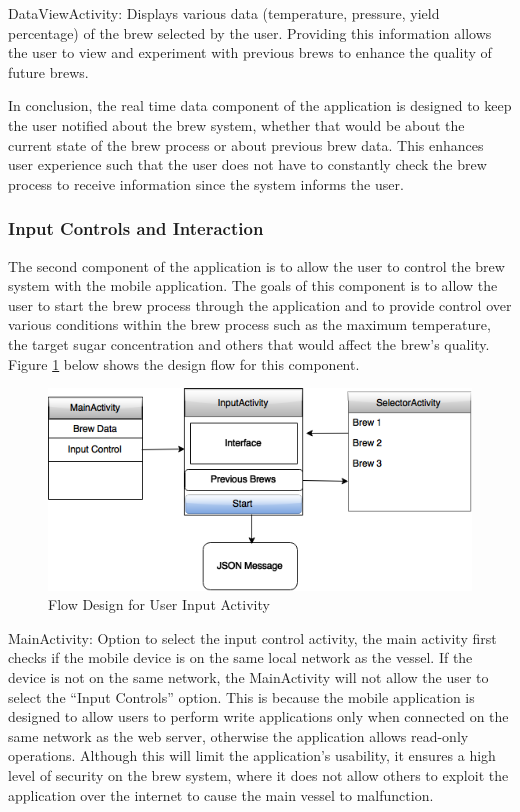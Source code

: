 \documentclass{article}
\begin{document}
\noindent DataViewActivity: Displays various data (temperature, pressure, yield percentage) of the brew selected by the user.
Providing this information allows the user to view and experiment with previous brews to enhance the quality of future brews. 

\noindent In conclusion, the real time data component of the application is designed to keep the user notified about the brew system, whether that would be about the current state of the brew process or about previous brew data. This enhances user experience such that the user does not have to constantly check the brew process to receive information since the system informs the user.

\subsubsection{Input Controls and Interaction}
The second component of the application is to allow the user to control the brew system with the mobile application. The goals of this component is to allow the user to start the brew process through the application and to provide control over various conditions within the brew process such as the maximum temperature, the target sugar concentration and others that would affect the brew's quality. Figure \ref{fig:input-activity} below shows the design flow for this component.

\begin{figure}[H]
\begin{center}
\includegraphics[scale=0.70]{input-activity.png}
\caption{Flow Design for User Input Activity}
\label{fig:input-activity}
\end{center}
\end{figure}

\noindent MainActivity: Option to select the input control activity, the main activity first checks if the mobile device is on the same local network as the vessel. If the device is not on the same network, the MainActivity will not allow the user to select the ``Input Controls'' option. This is because the mobile application is designed to allow users to perform write applications only when connected on the same network as the web server, otherwise the application allows read-only operations. Although this will limit the application's usability, it ensures a high level of security on the brew system, where it does not allow others to exploit the application over the internet to cause the main vessel to malfunction. 
\end{document}
